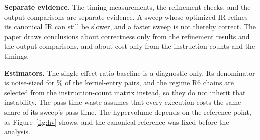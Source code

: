 \textbf{Separate evidence.} The timing measurements, the refinement checks, and the output comparisons are separate evidence. A
sweep whose optimized IR refines its canonical IR can still be slower, and a faster sweep is not thereby correct. The paper draws
conclusions about correctness only from the refinement results and the output comparisons, and about cost only from the
instruction counts and the timings.

\textbf{Estimators.} The single-effect ratio baseline is a diagnostic only. Its denominator is noise-sized for
\MpassNoiseDominatedPct{}\% of the kernel-entry pairs, and the regime R6 chains are selected from the instruction-count matrix instead, so they do not inherit that instability. The pass-time waste assumes that every execution costs the same share of its sweep's pass time. The hypervolume depends
on the reference point, as Figure~\ref{fig:hv} shows, and the canonical reference was fixed before the analysis.


